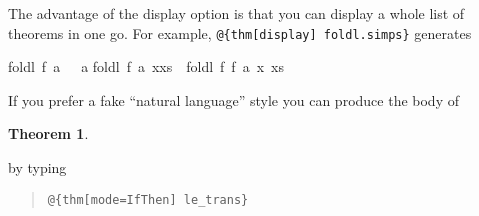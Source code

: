 \begin{isabellebody}
\begin{isamarkuptext}
The advantage of the display option is that you can display a whole
list of theorems in one go. For example,
\verb!@!\verb!{thm[display] foldl.simps}!
generates \begin{isabelle}%
foldl\ f\ a\ {}{}\ {}\ a\isasep\isanewline%
foldl\ f\ a\ {}x{}xs{}\ {}\ foldl\ f\ {}f\ a\ x{}\ xs%
\end{isabelle}%
\end{isamarkuptext}%
\isamarkuptrue%
%
\isamarkuptrue%
%
\begin{isamarkuptext}%
If you prefer a fake ``natural language'' style you can produce
the body of
\newtheorem{theorem}{Theorem}
\begin{theorem}
\end{theorem}
by typing
\begin{quote}
\verb!@!\verb!{thm[mode=IfThen] le_trans}!
\end{quote}


\end{isamarkuptext}
\end{isabellebody}
